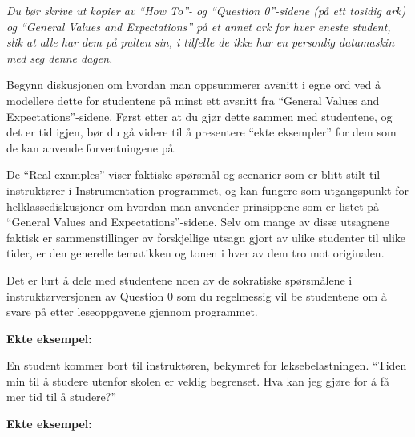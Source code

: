 












{\it Du bør skrive ut kopier av ``How To''- og ``Question 0''-sidene (på ett tosidig ark) og ``General Values and Expectations'' på et annet ark for hver eneste student, slik at alle har dem på pulten sin, i tilfelle de ikke har en personlig datamaskin med seg denne dagen.}

\vskip 10pt

Begynn diskusjonen om hvordan man oppsummerer avsnitt i egne ord ved å modellere dette for studentene på minst ett avsnitt fra ``General Values and Expectations''-sidene.  Først etter at du gjør dette sammen med studentene, og det er tid igjen, bør du gå videre til å presentere ``ekte eksempler'' for dem som de kan anvende forventningene på.

\vskip 10pt

De ``Real examples'' viser faktiske spørsmål og scenarier som er blitt stilt til instruktører i Instrumentation-programmet, og kan fungere som utgangspunkt for helklassediskusjoner om hvordan man anvender prinsippene som er listet på ``General Values and Expectations''-sidene.  Selv om mange av disse utsagnene faktisk er sammenstillinger av forskjellige utsagn gjort av ulike studenter til ulike tider, er den generelle tematikken og tonen i hver av dem tro mot originalen.

\vskip 10pt

Det er lurt å dele med studentene noen av de sokratiske spørsmålene i instruktørversjonen av Question 0 som du regelmessig vil be studentene om å svare på etter leseoppgavene gjennom programmet.









\vfil \eject
\noindent
{\bf Ekte eksempel:} 

En student kommer bort til instruktøren, bekymret for leksebelastningen.  ``Tiden min til å studere utenfor skolen er veldig begrenset.  Hva kan jeg gjøre for å få mer tid til å studere?''






\vfil \eject
\noindent
{\bf Ekte eksempel:} 

